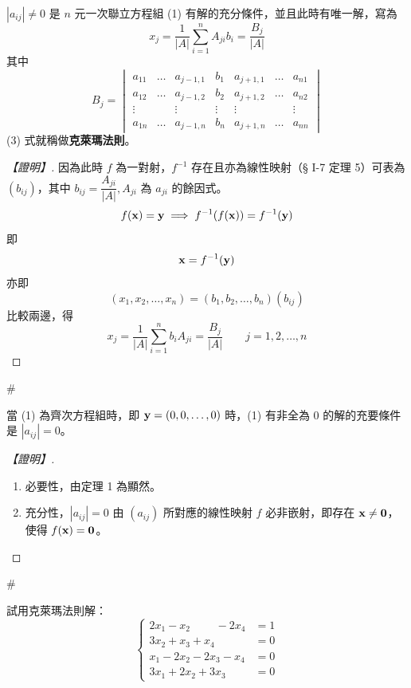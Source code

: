 \begin{theorem}\label{thm:b6-1-22}
$|a_{ij}| \ne 0$ 是 $n$ 元一次聯立方程組 (1) 有解的充分條件，並且此時有唯一解，寫為
\begin{equation}
x_j = \dfrac{1}{|A|} \sum_{i=1}^n A_{ji} b_i = \dfrac{B_j}{|A|} \label{eq:b6-1-8-3}
\end{equation}
其中
\[ B_j = \begin{vmatrix}
a_{11} & \dots & a_{j-1,1} & b_1 & a_{j+1,1} & \dots & a_{n1} \\
a_{12} & \dots & a_{j-1,2} & b_2 & a_{j+1,2} & \dots & a_{n2} \\
\vdots & & \vdots & \vdots & \vdots & & \vdots \\
a_{1n} & \dots & a_{j-1,n} & b_n & a_{j+1,n} & \dots & a_{nn}
\end{vmatrix} \]
(3) 式就稱做\textbf{克萊瑪法則}。
\end{theorem}

\begin{proof}[【證明】]
因為此時 $f$ 為一對射，$f^{-1}$ 存在且亦為線性映射（§ I-7 定理 5）可表為 $(b_{ij})$，其中 $b_{ij} = \dfrac{A_{ji}}{|A|}, A_{ji}$ 為 $a_{ji}$ 的餘因式。
\[ f(\boldsymbol{\mathbf{x}}) = \boldsymbol{\mathbf{y}} \implies f^{-1}(f(\boldsymbol{\mathbf{x}})) = f^{-1}(\boldsymbol{\mathbf{y}}) \]
即
\[ \boldsymbol{\mathbf{x}} = f^{-1}(\boldsymbol{\mathbf{y}}) \]
亦即
\[ (x_1, x_2, \dots, x_n) = (b_1, b_2, \dots, b_n)(b_{ij}) \]
比較兩邊，得
\[ x_j = \dfrac{1}{|A|} \sum_{i=1}^n b_i A_{ji} = \dfrac{B_j}{|A|} \qquad j=1, 2, \dots, n \]
\end{proof}\hfill$\#$

\begin{corollary}\label{cor:b6-1-6}
當 (1) 為齊次方程組時，即 $\boldsymbol{\mathbf{y}}=(0, 0, \dots, 0)$ 時，(1) 有非全為 0 的解的充要條件是 $|a_{ij}| = 0$。
\end{corollary}

\begin{proof}[【證明】]
\begin{enumerate}[label=(\roman*), leftmargin=2em]
  \item 必要性，由定理 1 為顯然。
  \item 充分性，$|a_{ij}| = 0$ 由 $(a_{ij})$ 所對應的線性映射 $f$ 必非嵌射，即存在 $\boldsymbol{\mathbf{x}} \ne \boldsymbol{\mathbf{0}}$，使得 $f(\boldsymbol{\mathbf{x}}) = \boldsymbol{\mathbf{0}}$。
\end{enumerate}
\end{proof}\hfill$\#$

\begin{example}\label{ex:b6-1-41}
試用克萊瑪法則解：
\[ \left\{\begin{aligned}
2x_1 - x_2 \phantom{+ 2x_3} - 2x_4 &= 1 \\
3x_2 + x_3 + x_4 &= 0 \\
x_1 - 2x_2 - 2x_3 - x_4 &= 0 \\
3x_1 + 2x_2 + 3x_3 \phantom{+ x_4} &= 0
\end{aligned}\right. \]
\end{example}

